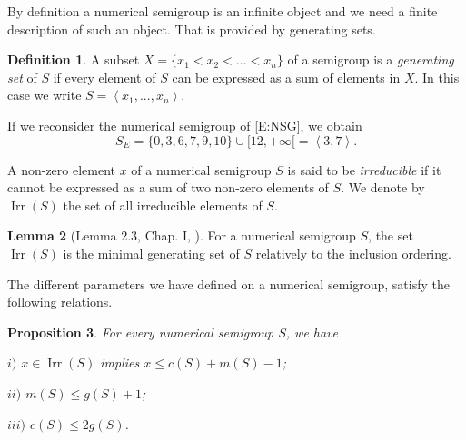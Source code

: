 \documentclass[reqno]{amsart}
\theoremstyle{plain}
\newtheorem{prop}{Proposition}[section]
\theoremstyle{definition}
\newtheorem{defi}[prop]{Definition}
\newtheorem{lem}[prop]{Lemma}
\renewcommand{\leq}{\leqslant}
\DeclareMathOperator{\Irr}{Irr}
\begin{document}
By definition a numerical semigroup is an infinite object and we need a finite description of such an object. 
That is provided by generating sets.


\begin{defi}
A subset $X=\{x_1<x_2<...<x_n\}$ of a semigroup is a \emph{generating set} of $S$ if every element of $S$ can be expressed as a sum of elements in $X$. 
In this case we write $S=\left<x_1,...,x_n\right>$.
\end{defi}

If we reconsider the numerical semigroup of \eqref{E:NSG}, we obtain
\begin{equation}
\label{E:GNSG}
S_E=\{0,3,6,7,9,10\}\cup[12,+\infty[=\left<3,7\right>.
\end{equation}


A non-zero element $x$ of a numerical semigroup $S$ is said to be \emph{irreducible} if it cannot be expressed as a sum of two non-zero elements of $S$.  
We denote by $\Irr(S)$ the set of all irreducible elements of $S$.

\begin{lem}[Lemma 2.3, Chap. I, \cite{BookNS}]
For a numerical semigroup $S$, the set $\Irr(S)$ is the minimal generating set of $S$ relatively to the inclusion ordering.
\end{lem} 


The different parameters we have defined on a numerical semigroup, satisfy the following relations.

\begin{prop}
\label{P:Res}
For every  numerical semigroup  $S$,  we have

$i)$  $x\in \Irr(S)$ implies $x\leq c(S)+m(S)-1$;

$ii)$ $m(S)\leq g(S)+1$;

$iii)$ $c(S)\leq 2 g(S)$.
\end{prop}
\end{document}
